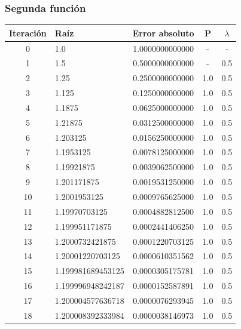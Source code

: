 \documentclass[titlepage,a4paper]{article}
\begin{document}
\subsubsection{Segunda función}\label{sec:bis2}

\begin{center}
    \begin{tabular}{| c | l | c | c | c |}
        \hline
        Iteración & Raíz & Error absoluto & P & $\lambda$ \\ \hline
    
        0      & 1.0  &  1.0000000000000  &  -  &  - \\
        1      & 1.5  &  0.5000000000000  &  -  &  0.5 \\
        2      & 1.25  &  0.2500000000000  &  1.0  &  0.5 \\
        3      & 1.125  &  0.1250000000000  &  1.0  &  0.5 \\
        4      & 1.1875  &  0.0625000000000  &  1.0  &  0.5 \\
        5      & 1.21875  &  0.0312500000000  &  1.0  &  0.5 \\
        6      & 1.203125  &  0.0156250000000  &  1.0  &  0.5 \\
        7      & 1.1953125  &  0.0078125000000  &  1.0  &  0.5 \\
        8      & 1.19921875  &  0.0039062500000  &  1.0  &  0.5 \\
        9      & 1.201171875  &  0.0019531250000  &  1.0  &  0.5 \\
        10      & 1.2001953125  &  0.0009765625000  &  1.0  &  0.5 \\
        11      & 1.19970703125  &  0.0004882812500  &  1.0  &  0.5 \\
        12      & 1.199951171875  &  0.0002441406250  &  1.0  &  0.5 \\
        13      & 1.2000732421875  &  0.0001220703125  &  1.0  &  0.5 \\
        14      & 1.20001220703125  &  0.0000610351562  &  1.0  &  0.5 \\
        15      & 1.199981689453125  &  0.0000305175781  &  1.0  &  0.5 \\
        16      & 1.199996948242187  &  0.0000152587891  &  1.0  &  0.5 \\
        17      & 1.200004577636718  &  0.0000076293945  &  1.0  &  0.5 \\
        18      & 1.200008392333984  &  0.0000038146973  &  1.0  &  0.5 \\

\end{tabular}
\end{center}
\end{document}
